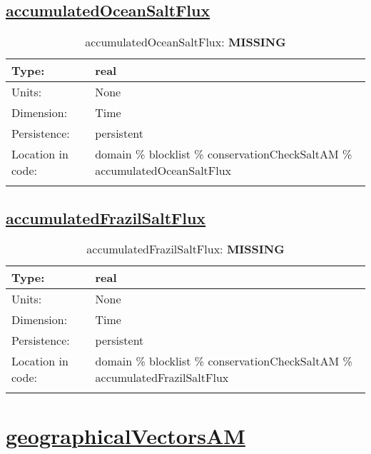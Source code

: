 \subsection[accumulatedOceanSaltFlux]{\hyperref[sec:var_tab_conservationCheckSaltAM]{accumulatedOceanSaltFlux}}
\label{subsec:var_sec_conservationCheckSaltAM_accumulatedOceanSaltFlux}
\begin{center}
\begin{longtable}{| p{2.0in} | p{4.0in} |}
        \hline 
        Type: & real \\
        \hline 
        Units: & \si{None} \\
        \hline 
        Dimension: & Time \\
        \hline 
        Persistence: & persistent \\
        \hline 
         Location in code: & domain \% blocklist \% conservationCheckSaltAM \% accumulatedOceanSaltFlux \\
         \hline 
    \caption{accumulatedOceanSaltFlux: {\bf \color{red} MISSING}}
\end{longtable}
\end{center}
\subsection[accumulatedFrazilSaltFlux]{\hyperref[sec:var_tab_conservationCheckSaltAM]{accumulatedFrazilSaltFlux}}
\label{subsec:var_sec_conservationCheckSaltAM_accumulatedFrazilSaltFlux}
\begin{center}
\begin{longtable}{| p{2.0in} | p{4.0in} |}
        \hline 
        Type: & real \\
        \hline 
        Units: & \si{None} \\
        \hline 
        Dimension: & Time \\
        \hline 
        Persistence: & persistent \\
        \hline 
         Location in code: & domain \% blocklist \% conservationCheckSaltAM \% accumulatedFrazilSaltFlux \\
         \hline 
    \caption{accumulatedFrazilSaltFlux: {\bf \color{red} MISSING}}
\end{longtable}
\end{center}
\section[geographicalVectorsAM]{\hyperref[sec:var_tab_geographicalVectorsAM]{geographicalVectorsAM}}
\label{sec:var_sec_geographicalVectorsAM}
